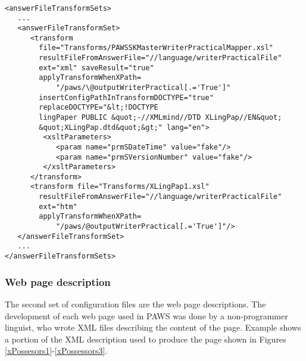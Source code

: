 \ea  \label{xConfigAnswerFileTransforms}%
\begin{verbatim}
 
<answerFileTransformSets>
   ...
   <answerFileTransformSet>
      <transform 
        file="Transforms/PAWSSKMasterWriterPracticalMapper.xsl"
        resultFileFromAnswerFile="//language/writerPracticalFile" 
        ext="xml" saveResult="true"
        applyTransformWhenXPath=
            "/paws/\@outputWriterPractical[.='True']"
        insertConfigPathInTransformDOCTYPE="true" 
        replaceDOCTYPE="&lt;!DOCTYPE 
        lingPaper PUBLIC &quot;-//XMLmind//DTD XLingPap//EN&quot; 
        &quot;XLingPap.dtd&quot;&gt;" lang="en">
         <xsltParameters>
            <param name="prmSDateTime" value="fake"/>
            <param name="prmSVersionNumber" value="fake"/>
         </xsltParameters>
      </transform>
      <transform file="Transforms/XLingPap1.xsl" 
        resultFileFromAnswerFile="//language/writerPracticalFile" 
        ext="htm"
        applyTransformWhenXPath=
            "/paws/@outputWriterPractical[.='True']"/>
   </answerFileTransformSet>
   ...
</answerFileTransformSets>
\end{verbatim}
\z

\subsubsection{Web page description}\label{sConfigWebPage}
The second set of configuration files are the web page descriptions. The development of each web page used in PAWS was done by a non-programmer linguist, who wrote XML files describing the content of the page. Example  shows a portion of the XML description used to produce the page shown in Figures \ref{xPossesors1}-\ref{xPossessors3}.

